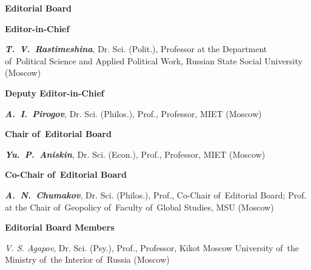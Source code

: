 


\begin{otherlanguage}{english}

\vspace*{-4em}

    \begin{center}
        \textbf{Editorial Board}
    \end{center}
    
    
    
    \begin{multicols}{2}
       \begin{flushleft}
            
        \scriptsize
    
\begin{center}
        \textbf{Editor-in-Chief}
\end{center}
    
\noindent\textit{\textbf{T. V. Rastimeshina}}, Dr. Sci. (Polit.), Professor at the Department of Political Science and Applied Political Work, Russian State Social University (Moscow)
    
        \begin{center}
        \textbf{Deputy Editor-in-Chief}
        \end{center}
    
\noindent  \textit{\textbf{A. I. Pirogov}}, Dr. Sci. (Philos.), Prof., Professor, MIET (Moscow)

\begin{center}
    \textbf{Chair of Editorial Board}
    \end{center}

\noindent \textit{\textbf{Yu. P. Aniskin}}, Dr. Sci. (Econ.), Prof., Professor, MIET (Moscow)

\begin{center}
    \textbf{Co-Chair of Editorial Board}
    \end{center}

\noindent \textit{\textbf{A. N. Chumakov}}, Dr. Sci. (Philos.), Prof., Co-Chair of Editorial Board; Prof. at the Chair of Geopolicy of Faculty of Global Studies, MSU (Moscow)

\begin{center}
    \textbf{Editorial Board Members}
\end{center}

\noindent \textit{V. S. Agapov}, Dr. Sci. (Psy.), Prof., Professor, Kikot Moscow University of the Ministry of the Interior of Russia (Moscow)


\end{flushleft}
\end{multicols}
\end{otherlanguage}
